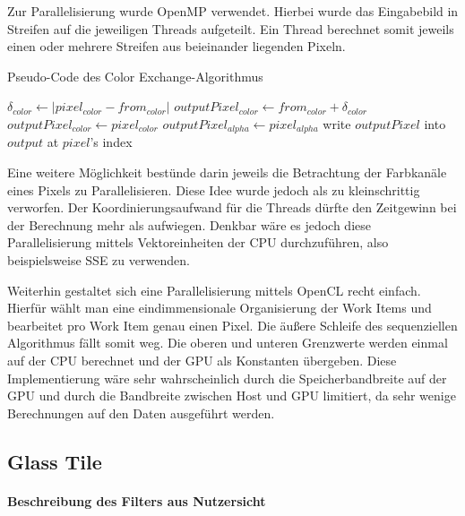 \documentclass[10pt,a4paper]{article}
\providecommand{\abs}[1]{\lvert#1\rvert}
\begin{document}
Zur Parallelisierung wurde OpenMP verwendet. Hierbei wurde das Eingabebild in Streifen auf die jeweiligen Threads aufgeteilt. Ein Thread berechnet somit jeweils einen oder mehrere Streifen aus beieinander liegenden Pixeln.

\begin{algorithm}[H]
\caption{Pseudo-Code des \glqq Color Exchange\grqq-Algorithmus}
\label{algo:exchange_par}
\begin{algorithmic}[1]
      \State $\delta_{color} \gets \abs{ pixel_{color} - from_{color}}$    
        \State $outputPixel_{color} \gets from_{color} + \delta_{color}$
      \Else
        \State $outputPixel_{color} \gets pixel_{color}$
      \EndIf
    \EndFor
    \State $outputPixel_{alpha} \gets pixel_{alpha}$
    \State write $outputPixel$ into $output$ at $pixel$'s index 
  \EndFor
\EndFor
\end{algorithmic}
\end{algorithm}
 
Eine weitere Möglichkeit bestünde darin jeweils die Betrachtung der Farbkanäle eines Pixels zu Parallelisieren. Diese Idee wurde jedoch als zu kleinschrittig verworfen. Der Koordinierungsaufwand für die Threads dürfte den Zeitgewinn bei der Berechnung mehr als aufwiegen. Denkbar wäre es jedoch diese Parallelisierung mittels Vektoreinheiten der CPU durchzuführen, also beispielsweise SSE zu verwenden.

Weiterhin gestaltet sich eine Parallelisierung mittels OpenCL recht einfach. Hierfür wählt man eine eindimmensionale Organisierung der Work Items und bearbeitet pro Work Item genau einen Pixel. Die äußere Schleife des sequenziellen Algorithmus fällt somit weg. Die oberen und unteren Grenzwerte werden einmal auf der CPU berechnet und der GPU als Konstanten übergeben. Diese Implementierung wäre sehr wahrscheinlich durch die Speicherbandbreite auf der GPU und durch die Bandbreite zwischen Host und GPU limitiert, da sehr wenige Berechnungen auf den Daten ausgeführt werden.

\subsection{Glass Tile}
\paragraph{Beschreibung des Filters aus Nutzersicht}
\end{document}

